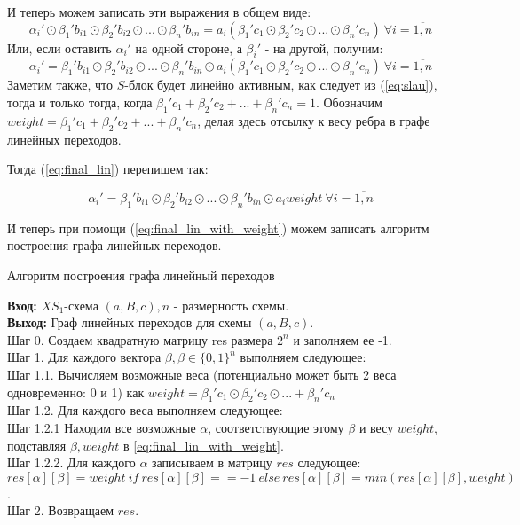 \documentclass[a4paper,12pt]{report}
\theoremstyle{plain} %
\theoremstyle{definition}
\theoremstyle{remark}
\begin{document}
\begin{large}
И теперь можем записать эти выражения в общем виде:
\begin{equation}\label{eq:slau}\alpha_i' \odot \beta_1'b_{i1} \odot \beta_2'b_{i2} \odot ... \odot \beta_n'b_{in} = a_i(\beta_1'c_1 \odot \beta_2'c_2 \odot ... \odot \beta_n'c_n) ~ \forall i=\overline{1,n} \end{equation}
Или, если оставить $\alpha_i'$ на одной стороне, а $\beta_i'$ - на другой, получим:
\begin{equation}\label{eq:final_lin}\alpha_i' = \beta_1'b_{i1} \odot \beta_2'b_{i2} \odot ... \odot \beta_n'b_{in} \odot a_i(\beta_1'c_1 \odot \beta_2'c_2 \odot ... \odot \beta_n'c_n) ~ \forall i=\overline{1,n} \end{equation}
Заметим также, что $S$-блок будет линейно активным, как следует из (\ref{eq:slau}), тогда и только тогда, когда  $\beta_1'c_1 + \beta_2'c_2 + ... + \beta_n'c_n=1$. Обозначим $weight = \beta_1'c_1 + \beta_2'c_2 + ... + \beta_n'c_n$, делая здесь отсылку к весу ребра в графе линейных переходов.

Тогда  (\ref{eq:final_lin}) перепишем так:

\begin{equation}\label{eq:final_lin_with_weight}\alpha_i' = \beta_1'b_{i1} \odot \beta_2'b_{i2} \odot ... \odot \beta_n'b_{in} \odot a_iweight ~ \forall i=\overline{1,n} \end{equation}

И теперь при помощи (\ref{eq:final_lin_with_weight}) можем записать алгоритм построения графа линейных переходов.

\begin{algorithm}[H]
\caption{Алгоритм построения графа линейный переходов}
\label{diff_graph_construct}
\textbf{Вход:} $XS_1$-схема $(a, B, c), n$ - размерность схемы.\\
\textbf{Выход:} Граф линейных переходов для схемы $(a, B, c)$.\\
Шаг 0. Создаем квадратную матрицу res размера $2^n$ и заполняем ее -1. \\
Шаг 1. Для каждого вектора $\beta, \beta \in \{0, 1\}^n$ выполняем следующее: \\
Шаг 1.1. Вычисляем возможные веса (потенциально может быть 2 веса одновременно: 0 и 1) как $weight=\beta_1'c_1 \odot \beta_2'c_2 \odot ... + \beta_n'c_n$\\
Шаг 1.2. Для каждого веса выполняем следующее:\\
Шаг 1.2.1 Находим все возможные $\alpha$, соответствующие этому $\beta$ и весу $weight$, подставляя $\beta, weight$ в \ref{eq:final_lin_with_weight}.\\
Шаг 1.2.2. Для каждого $\alpha$ записываем в матрицу $res$ следующее: $res[\alpha][\beta] = weight ~if~ res[\alpha][\beta] == -1 ~else~res[\alpha][\beta]=min(res[\alpha][\beta], weight)  $.\\
Шаг 2. Возвращаем $res$.\\
\end{algorithm} 


\end{large}
\end{document}
